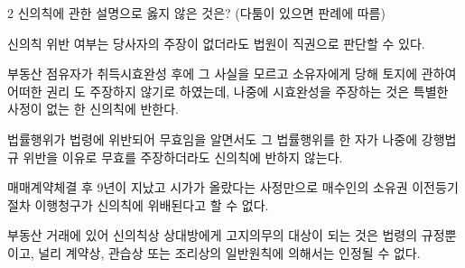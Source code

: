 \begin{question}{2}
신의칙에 관한 설명으로 옳지 않은 것은? (다툼이 있으면 판례에 따름)
\begin{choices}
  \item 신의칙 위반 여부는 당사자의 주장이 없더라도 법원이 직권으로 판단할 수 있다.
  \item 부동산 점유자가 취득시효완성 후에 그 사실을 모르고 소유자에게 당해 토지에 관하여 어떠한 권리 도 주장하지 않기로 하였는데, 나중에 시효완성을 주장하는 것은 특별한 사정이 없는 한 신의칙에 반한다.
  \item 법률행위가 법령에 위반되어 무효임을 알면서도 그 법률행위를 한 자가 나중에 강행법규 위반을 이유로 무효를 주장하더라도 신의칙에 반하지 않는다.
  \item 매매계약체결 후 9년이 지났고 시가가 올랐다는 사정만으로 매수인의 소유권 이전등기절차 이행청구가 신의칙에 위배된다고 할 수 없다.
  \item 부동산 거래에 있어 신의칙상 상대방에게 고지의무의 대상이 되는 것은 법령의 규정뿐이고, 널리 계약상, 관습상 또는 조리상의 일반원칙에 의해서는 인정될 수 없다.
\end{choices}
\end{question}
